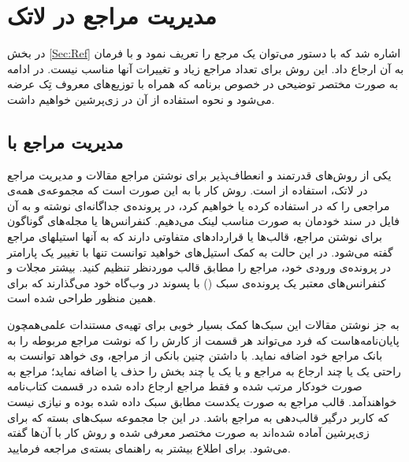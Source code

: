 %
    
\chapter{مدیریت مراجع در لاتک}\label{App:RefMan}
\thispagestyle{empty}

در بخش \ref{Sec:Ref} اشاره شد که با دستور 
  می‌توان یک مرجع را تعریف نمود و با فرمان
  به آن ارجاع داد. این روش برای تعداد مراجع زیاد و تغییرات آنها مناسب نیست. در ادامه به صورت مختصر توضیحی در خصوص برنامه  که همراه با توزیع‌های معروف تِک عرضه می‌شود و نحوه استفاده از آن در زی‌پرشین خواهیم داشت.

\section{ مدیریت مراجع با  \texorpdfstring{}{Bib\TeX} }
یکی از روش‌های قدرتمند و انعطاف‌پذیر برای نوشتن مراجع مقالات و مدیریت مراجع در لاتک، استفاده از   است.
 روش کار با   به این صورت است که مجموعه‌ی همه‌ی مراجعی را که در \پ استفاده کرده یا خواهیم کرد، 
در پرونده‌ی جداگانه‌ای نوشته و به آن فایل در سند خودمان به صورت مناسب لینک می‌دهیم.
 کنفرانس‌ها یا مجله‌های گوناگون برای نوشتن مراجع، قالب‌ها یا قراردادهای متفاوتی دارند که به آنها استیلهای مراجع گفته می‌شود.
 در این حالت به کمک ‌استیل‌های  خواهید توانست تنها با تغییر یک پارامتر در پرونده‌ی ورودی خود، مراجع را مطابق قالب موردنظر تنظیم کنید. 
 بیشتر مجلات و کنفرانس‌های معتبر یک پرونده‌ی سبک () با پسوند  در وب‌گاه خود می‌گذارند که برای همین منظور طراحی شده است.

به جز نوشتن مقالات این سبک‌ها کمک بسیار خوبی برای تهیه‌ی مستندات علمی‌همچون پایان‌نامه‌هاست که فرد می‌تواند هر قسمت از کارش را که نوشت مراجع مربوطه را به بانک مراجع خود اضافه نماید. با داشتن چنین بانکی از مراجع، وی خواهد توانست به راحتی یک یا چند ارجاع به مراجع و یا یک یا چند بخش را حذف یا اضافه ‌نماید؛ 
مراجع به صورت خودکار مرتب شده و فقط مراجع ارجاع داده شده در قسمت کتاب‌نامه خواهندآمد. قالب مراجع به صورت یکدست مطابق سبک داده شده بوده و نیازی نیست که کاربر درگیر قالب‌دهی به مراجع باشد. 
در این جا مجموعه‌ سبک‌های بسته  که برای  زی‌پرشین آماده شده‌اند به صورت مختصر معرفی شده و روش کار با آن‌ها گفته می‌شود. برای اطلاع بیشتر به راهنمای بسته‌ی  مراجعه فرمایید.
